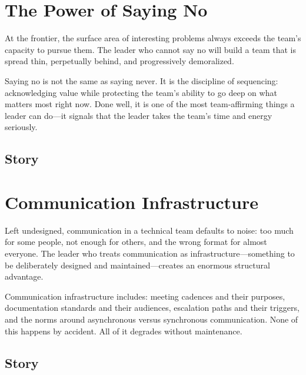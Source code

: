 \section{The Power of Saying No}


At the frontier, the surface area of interesting problems always exceeds the
team's capacity to pursue them. The leader who cannot say no will build a team
that is spread thin, perpetually behind, and progressively demoralized.

Saying no is not the same as saying never. It is the discipline of sequencing:
acknowledging value while protecting the team's ability to go deep on what matters
most right now. Done well, it is one of the most team-affirming things a leader
can do---it signals that the leader takes the team's time and energy seriously.

\subsection{Story}

\section{Communication Infrastructure}


Left undesigned, communication in a technical team defaults to noise: too much
for some people, not enough for others, and the wrong format for almost everyone.
The leader who treats communication as infrastructure---something to be deliberately
designed and maintained---creates an enormous structural advantage.

Communication infrastructure includes: meeting cadences and their purposes,
documentation standards and their audiences, escalation paths and their triggers,
and the norms around asynchronous versus synchronous communication. None of this
happens by accident. All of it degrades without maintenance.

\subsection{Story}

